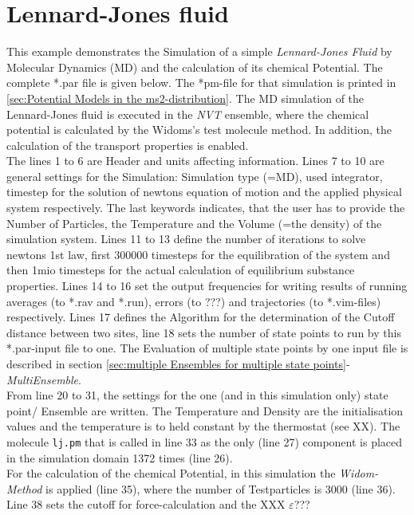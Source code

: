 \section{Lennard-Jones fluid}
\label{sec:Example_Lennard-Jones Fluid}
This example demonstrates the Simulation of a simple \textit{Lennard-Jones Fluid} by Molecular Dynamics (MD) and the calculation of its chemical Potential. The complete *.par file is given below. The *pm-file for that simulation is printed in \ref{sec:Potential Models in the ms2-distribution}. The MD simulation of the Lennard-Jones fluid is executed in the \textit{NVT} ensemble, where the chemical potential is calculated by the Widoms's test molecule method. In addition, the calculation of the transport properties is enabled.\\
The lines 1 to 6 are Header and units affecting information. Lines 7 to 10 are general settings for the Simulation: Simulation type (=MD), used integrator, timestep for the solution of newtons equation of motion and the applied physical system respectively. 
The last keywords indicates, that the user has to provide the Number of Particles, the Temperature and the Volume (=the density) of the simulation system. Lines 11 to 13 define the number of iterations to solve newtons 1st law, first 300000 timesteps for the equilibration of the system and then 1mio timesteps for the actual calculation of equilibrium substance properties. Lines 14 to 16 set the output frequencies for writing results of running averages (to *.rav and *.run), errors (to ???) and trajectories (to *.vim-files) respectively. Lines 17 defines the Algorithm for the determination of the Cutoff distance between two sites, line 18 sets the number of state points to run by this *.par-input file to one. The Evaluation of multiple state points by one input file is described in section \ref{sec:multiple Ensembles for multiple state points}-\textit{MultiEnsemble}.\\
From line 20 to 31, the settings for the one (and in this simulation only) state point/ Ensemble are written. The Temperature and Density are the initialisation values and the temperature is to held constant by the thermostat (see XX). The molecule \texttt{lj.pm} that is called in line 33 as the only (line 27)  component is placed in the simulation domain 1372 times (line 26).\\
For the calculation of the chemical Potential, in this simulation the \textit{Widom-Method} is applied (line 35), where the number of Testparticles is 3000 (line 36). Line 38 sets the cutoff for force-calculation and the XXX $\varepsilon$???

